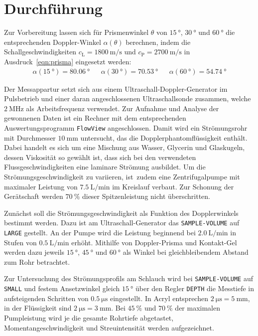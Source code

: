 \section{Durchführung}
\label{sec:durchführung}

Zur Vorbereitung lassen sich für Prismenwinkel $\theta$ von $\qty{15}{\degree}$, $\qty{30}{\degree}$ und $\qty{60}{\degree}$ die
entsprechenden Doppler-Winkel $\alpha (\theta)$ berechnen, indem die Schallgeschwindigkeiten $c_\text{L} = \qty{1800}{\meter\per\second}$
und $c_\text{P} = \qty{2700}{\meter\per\second}$ \cite{doppler}
in Ausdruck~\eqref{eqn:prisma} eingesetzt werden:
\begin{align*}
\alpha (\qty{15}{\degree}) = \qty{80.06}{\degree} &&
\alpha (\qty{30}{\degree}) = \qty{70.53}{\degree} &&
\alpha (\qty{60}{\degree}) = \qty{54.74}{\degree}
\end{align*}

Der Messappartur setzt sich aus einem Ultraschall-Doppler-Generator im Pulsbetrieb und einer daran angeschlossenen Ultraschallsonde zusammen,
welche $\qty{2}{\mega\hertz}$ als Arbeitsfrequenz verwendet. Zur Aufnahme und Analyse der gewonnenen Daten ist ein Rechner mit dem
entsprechenden Auswertungsprogramm \verb+FlowView+ angeschlossen. Damit wird ein Strömungsrohr mit Durchmesser $\qty{10}{\milli\meter}$
untersucht, das die Dopplerphantomflüssigkeit enthält. Dabei handelt es sich um eine Mischung aus Wasser, Glycerin und Glaskugeln,
dessen Viskosität so gewählt ist, dass sich bei den verwendeten Flussgeschwindigkeiten eine laminare Strömung ausbildet. Um die
Strömungsgeschwindigkeit zu variieren, \mbox{ist zudem} eine Zentrifugalpumpe mit maximaler Leistung von
$\qty[per-mode=symbol]{7.5}{\liter\per\minute}$ im Kreislauf verbaut. Zur Schonung der Gerätschaft werden $\qty{70}{\percent}$
dieser Spitzenleistung nicht überschritten.

Zunächst soll die Strömungsgeschwindigkeit als Funktion des Dopplerwinkels bestimmt werden. Dazu ist am Ultraschall-Generator
das \verb+SAMPLE-VOLUME+ auf \verb+LARGE+ gestellt. An der Pumpe wird die Leistung beginnend bei $\qty[per-mode=symbol]{2.0}{\liter\per\minute}$
in Stufen von $\qty[per-mode=symbol]{0.5}{\liter\per\minute}$ erhöht. Mithilfe von Doppler-Prisma und Kontakt-Gel werden dazu jeweils
$\qty{15}{\degree}$, $\qty{45}{\degree}$ und $\qty{60}{\degree}$ als Winkel bei gleichbleibendem Abstand zum Rohr betrachtet. 

Zur Untersuchung des Strömungsprofils am Schlauch wird bei \verb+SAMPLE-VOLUME+ auf \verb+SMALL+ und festem Ansetzwinkel gleich $\qty{15}{\degree}$
über den Regler \verb+DEPTH+ die Messtiefe in aufsteigenden Schritten von $\qty{0.5}{\micro\second}$ eingestellt. In Acryl entsprechen
$\qty{2}{\micro\second} = \qty{5}{\milli\meter}$, in der Flüssigkeit sind $\qty{2}{\micro\second} = \qty{3}{\milli\meter}$. Bei $\qty{45}{\percent}$
und $\qty{70}{\percent}$ der maximalen Pumpleistung wird je die gesamte Rohrtiefe abgetastet, Momentangeschwindigkeit und Streuintensität 
werden aufgezeichnet.

